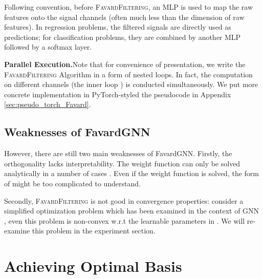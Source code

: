 Following convention, before \textsc{FavardFiltering}, an MLP is used to map the raw features onto the signal
channels (often much less than the dimension of raw features). In regression
problems, the filtered signals are directly used as predictions; for
classification problems, they are combined by another MLP followed by a
softmax layer.


\textbf{Parallel Execution.\quad}Note that for convenience of presentation, we
write the \textsc{FavardFiltering} Algorithm in a form of nested loops. In fact, the
computation on different channels (the inner loop ) is conducted
simultaneously. We put more concrete implementation in PyTorch-styled
the pseudocode in Appendix \ref{sec:pseudo_torch_Favard}.







































\subsection{Weaknesses of FavardGNN}
\label{sec:weakness}




However, there are still two main weaknesses of FavardGNN. Firstly, the orthogonality lacks interpretability. 
The weight function  can only be solved analytically in a number of cases \cite{Geronimo1991weightfunction}.  
Even if the weight function is solved, the form of  might be too complicated to understand. 

Secondly, 
\textsc{FavardFiltering} is not good in  convergence properties:
consider a simplified optimization problem  which has been examined in the context of GNN 
\cite{keyulu2021Optm, Wang2022jacobi}, 
even this problem is non-convex w.r.t the learnable parameters in . 
We will re-examine this problem in the experiment section.  \section{Achieving Optimal Basis}
\label{sec:optbasis}

